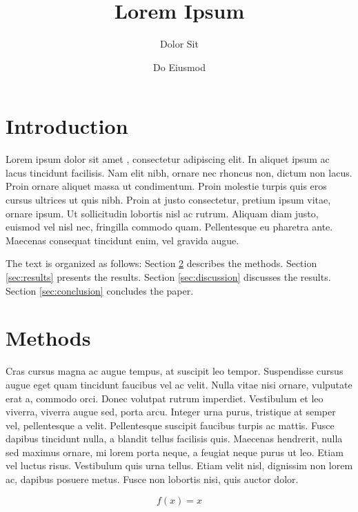 \documentclass[12pt, aps, prb]{revtex4-2}
\begin{document}
\title{Lorem Ipsum}

\author{Dolor Sit}


\author{Do Eiusmod}

\maketitle

\section{Introduction}

Lorem ipsum dolor sit amet \cite{baroni2001}, consectetur adipiscing elit. In aliquet ipsum ac lacus tincidunt facilisis. Nam elit nibh, ornare nec rhoncus non, dictum non lacus. Proin ornare aliquet massa ut condimentum. Proin molestie turpis quis eros cursus ultrices ut quis nibh. Proin at justo consectetur, pretium ipsum vitae, ornare ipsum. Ut sollicitudin lobortis nisl ac rutrum. Aliquam diam justo, euismod vel nisl nec, fringilla commodo quam. Pellentesque eu pharetra ante. Maecenas consequat tincidunt enim, vel gravida augue.

The text is organized as follows: Section \ref{sec:methods} describes the methods. Section \ref{sec:results} presents the results. Section \ref{sec:discussion} discusses the results. Section \ref{sec:conclusion} concludes the paper.

\section{Methods}
\label{sec:methods}

Cras cursus magna ac augue tempus, at suscipit leo tempor. Suspendisse cursus augue eget quam tincidunt faucibus vel ac velit. Nulla vitae nisi ornare, vulputate erat a, commodo orci. Donec volutpat rutrum imperdiet. Vestibulum et leo viverra, viverra augue sed, porta arcu. Integer urna purus, tristique at semper vel, pellentesque a velit. Pellentesque suscipit faucibus turpis ac mattis. Fusce dapibus tincidunt nulla, a blandit tellus facilisis quis. Maecenas hendrerit, nulla sed maximus ornare, mi lorem porta neque, a feugiat neque purus ut leo. Etiam vel luctus risus. Vestibulum quis urna tellus. Etiam velit nisl, dignissim non lorem ac, dapibus posuere metus. Fusce non lobortis nisi, quis auctor dolor.

\begin{equation}
    f(x) = x
    \label{eq:linear}
\end{equation}
\end{document}
